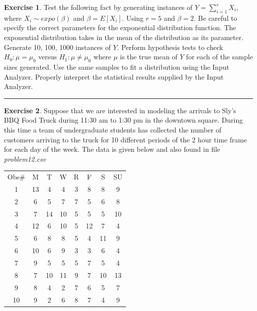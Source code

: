 \documentclass[
]{book}
\theoremstyle{definition}
\theoremstyle{definition}
\theoremstyle{definition}
\newtheorem{exercise}{Exercise}[chapter]
\theoremstyle{definition}
\theoremstyle{remark}
\begin{document}
\begin{exercise}
\protect\hypertarget{exr:AppDistFitP11}{}{\label{exr:AppDistFitP11} }Test the following fact by generating instances of
\(Y = \sum_{i=1}^{r} X_i\), where \(X_i \sim \mathit{expo}(\beta)\) and
\(\beta = E[X_i]\). Using \(r=5\) and \(\beta =2\). Be careful to specify the
correct parameters for the exponential distribution function.
The exponential distribution takes in the mean of the distribution
as its parameter. Generate 10, 100, 1000 instances of \(Y\). Perform
hypothesis tests to check \(H_0: \mu = \mu_0\) versus
\(H_1: \mu \neq \mu_0\) where \(\mu\) is the true mean of \(Y\) for each of
the sample sizes generated. Use the same samples to fit a distribution
using the Input Analyzer. Properly interpret the statistical results
supplied by the Input Analyzer.
\end{exercise}

\begin{center}\rule{0.5\linewidth}{0.5pt}\end{center}

\begin{exercise}
\protect\hypertarget{exr:AppDistFitP12}{}{\label{exr:AppDistFitP12} }Suppose that we are interested in modeling the arrivals to Sly's BBQ
Food Truck during 11:30 am to 1:30 pm in the downtown square. During
this time a team of undergraduate students has collected the number of
customers arriving to the truck for 10 different periods of the 2 hour
time frame for each day of the week. The data is given below and also found in file \emph{problem12.csv}
\end{exercise}

\begin{longtable}[]{@{}cccccccc@{}}
\toprule
\endhead
Obs\# & M & T & W & R & F & S & SU \\
1 & 13 & 4 & 4 & 3 & 8 & 8 & 9 \\
2 & 6 & 5 & 7 & 7 & 5 & 6 & 8 \\
3 & 7 & 14 & 10 & 5 & 5 & 5 & 10 \\
4 & 12 & 6 & 10 & 5 & 12 & 7 & 4 \\
5 & 6 & 8 & 8 & 5 & 4 & 11 & 9 \\
6 & 10 & 6 & 9 & 3 & 3 & 6 & 4 \\
7 & 9 & 5 & 5 & 5 & 7 & 5 & 4 \\
8 & 7 & 10 & 11 & 9 & 7 & 10 & 13 \\
9 & 8 & 4 & 2 & 7 & 6 & 5 & 7 \\
10 & 9 & 2 & 6 & 8 & 7 & 4 & 9 \\
\bottomrule
\end{longtable}
\end{document}

